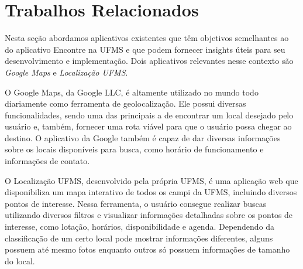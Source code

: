 \section{Trabalhos Relacionados}

Nesta seção abordamos aplicativos existentes que têm objetivos semelhantes ao do aplicativo Encontre na UFMS e que podem fornecer insights úteis para seu desenvolvimento e implementação. Dois aplicativos relevantes nesse contexto são \textit{Google Maps}\cite{maps2005} e \textit{Localização UFMS}\cite{localizacaoufms}.

O Google Maps, da Google LLC, é altamente utilizado no mundo todo diariamente como ferramenta de geolocalização. Ele possui diversas funcionalidades, sendo uma das principais a de encontrar um local desejado pelo usuário e, também, fornecer uma rota viável para que o usuário possa chegar ao destino. O aplicativo da Google também é capaz de dar diversas informações sobre os locais disponíveis para busca, como horário de funcionamento e informações de contato.

O Localização UFMS, desenvolvido pela própria UFMS, é uma aplicação web que disponibiliza um mapa interativo de todos os campi da UFMS, incluindo diversos pontos de interesse. Nessa ferramenta, o usuário consegue realizar buscas utilizando diversos filtros e visualizar informações detalhadas sobre os pontos de interesse, como lotação, horários, disponibilidade e agenda. Dependendo da classificação de um certo local pode mostrar informações diferentes, alguns possuem até mesmo fotos enquanto outros só possuem informações de tamanho do local. 